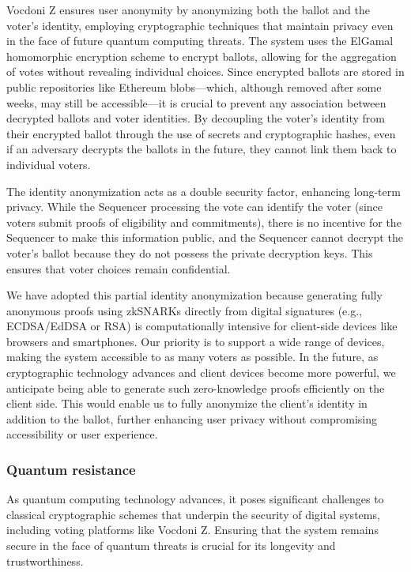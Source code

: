 Vocdoni Z ensures user anonymity by anonymizing both the ballot and the voter's identity, employing cryptographic techniques that maintain privacy even in the face of future quantum computing threats. The system uses the ElGamal homomorphic encryption scheme to encrypt ballots, allowing for the aggregation of votes without revealing individual choices. Since encrypted ballots are stored in public repositories like Ethereum blobs—which, although removed after some weeks, may still be accessible—it is crucial to prevent any association between decrypted ballots and voter identities. By decoupling the voter's identity from their encrypted ballot through the use of secrets and cryptographic hashes, even if an adversary decrypts the ballots in the future, they cannot link them back to individual voters.

The identity anonymization acts as a double security factor, enhancing long-term privacy. While the Sequencer processing the vote can identify the voter (since voters submit proofs of eligibility and commitments), there is no incentive for the Sequencer to make this information public, and the Sequencer cannot decrypt the voter's ballot because they do not possess the private decryption keys. This ensures that voter choices remain confidential.

We have adopted this partial identity anonymization because generating fully anonymous proofs using zkSNARKs directly from digital signatures (e.g., ECDSA/EdDSA or RSA) is computationally intensive for client-side devices like browsers and smartphones. Our priority is to support a wide range of devices, making the system accessible to as many voters as possible. In the future, as cryptographic technology advances and client devices become more powerful, we anticipate being able to generate such zero-knowledge proofs efficiently on the client side. This would enable us to fully anonymize the client's identity in addition to the ballot, further enhancing user privacy without compromising accessibility or user experience.

\subsubsection{Quantum resistance}

As quantum computing technology advances, it poses significant challenges to classical cryptographic schemes that underpin the security of digital systems, including voting platforms like Vocdoni Z. Ensuring that the system remains secure in the face of quantum threats is crucial for its longevity and trustworthiness.

